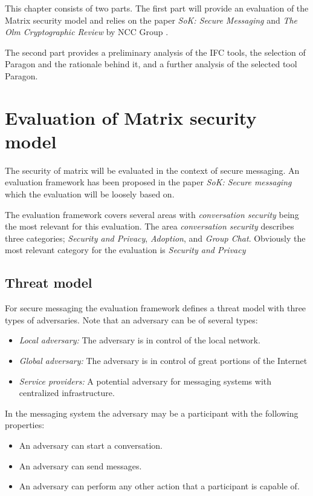 This chapter consists of two parts. The first part will provide an evaluation of the Matrix security model and relies on the paper \emph{SoK: Secure Messaging} \cite{sok} and \emph{The Olm Cryptographic Review} by NCC Group \cite{ncc}. 

The second part provides a preliminary analysis of the IFC tools, the selection of Paragon and the rationale behind it, and a further analysis of the selected tool Paragon.


\section{Evaluation of Matrix security model}\label{evaluationofmatrix}
The security of matrix will be evaluated in the context of secure messaging. An evaluation framework has been proposed in the paper \emph{SoK: Secure messaging} which the evaluation will be loosely based on. 

The evaluation framework covers several areas with \emph{conversation security} being the most relevant for this evaluation. The area \emph{conversation security} describes three categories; \emph{Security and Privacy}, \emph{Adoption}, and \emph{Group Chat}. Obviously the most relevant category for the evaluation is \emph{Security and Privacy}

\subsection{Threat model}
For secure messaging the evaluation framework defines a threat model with three types of adversaries. Note that an adversary can be of several types:

\begin{itemize}
	\item \emph{Local adversary:} The adversary is in control of the local network.
	\item \emph{Global adversary:} The adversary is in control of great portions of the Internet 
	\item \emph{Service providers:} A potential adversary for messaging systems with centralized infrastructure.
\end{itemize}

In the messaging system the adversary may be a participant with the following properties:

\begin{itemize}
	\item An adversary can start a conversation.
	\item An adversary can send messages.
	\item An adversary can perform any other action that a participant is capable of.
\end{itemize}

